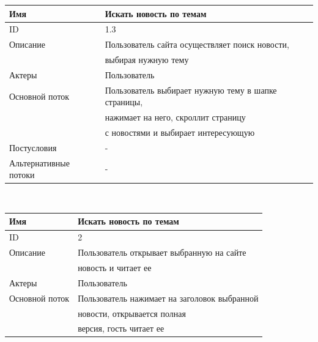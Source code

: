 \begin{center}
    \small
    \begin{tabular}{|l|l|}
        \hline
        Имя                   & Искать новость по темам                             \\
        \hline
        ID                    & 1.3                                                 \\
        \hline
        Описание              & Пользователь сайта осуществляет поиск новости,      \\
        & выбирая нужную тему                                 \\
        \hline
        Актеры                & Пользователь                                        \\
        \hline
        Основной поток        & Пользователь выбирает нужную тему в шапке страницы, \\
        & нажимает на него, скроллит страницу                 \\
        & с новостями и выбирает интересующую                 \\
        \hline
        Постусловия           & -                                                   \\
        \hline
        Альтернативные потоки & -                                                   \\
        \hline
    \end{tabular}\\
    \vspace{0.5cm}
    \begin{tabular}{|l|l|}
        \hline
        Имя                   & Искать новость по темам                      \\
        \hline
        ID                    & 2                                            \\
        \hline
        Описание              & Пользователь открывает выбранную на сайте    \\
        & новость и читает ее                          \\
        \hline
        Актеры                & Пользователь                                 \\
        \hline
        Основной поток        & Пользователь нажимает на заголовок выбранной \\
        & новости, открывается полная                  \\
        & версия, гость читает ее                      \\

\end{tabular}
\end{center}
